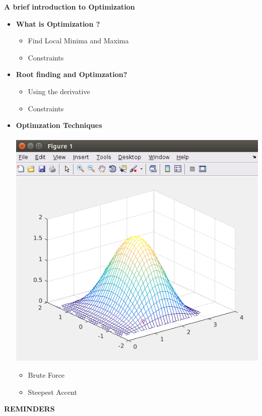 \documentclass[11pt]{article}
\begin{document}
\begin{itemize}
\end{itemize}
\newpage 

\textbf{ \LARGE A brief introduction to Optimization } \\

\begin{itemize}
\Large
	\item \textbf{\LARGE What is Optimization ?}
		\begin{itemize}
			\item Find Local Minima and Maxima \vspace{80mm}	
			\item Constraints	
		\end{itemize}
		\newpage
		
	\item \textbf{\LARGE Root finding and Optimzation?}
		\begin{itemize}
			\item Using the derivative \vspace{80mm}	
			\item Constraints	
		\end{itemize}
		\newpage

	\item \textbf{\LARGE Optimzation Techniques}\\\\
		\includegraphics[scale=1]{lecture4_fig1.png}
		\begin{itemize}
			\item Brute Force \vspace{30mm}
			\item Steepest Accent	
		\end{itemize}
		\newpage

\end{itemize}
\textbf{ \LARGE REMINDERS } \\
\end{document}
